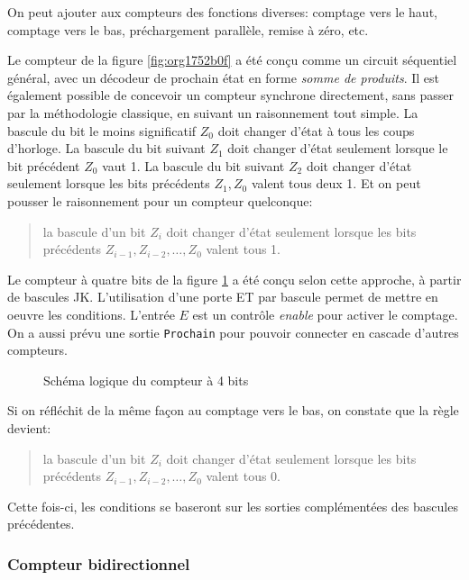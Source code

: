 \documentclass[11pt]{article}
\begin{document}
On peut ajouter aux compteurs des fonctions diverses: comptage vers le
haut, comptage vers le bas, préchargement parallèle, remise à zéro,
etc.

Le compteur de la figure \ref{fig:org1752b0f} a été conçu comme un circuit
séquentiel général, avec un décodeur de prochain état en forme \emph{somme
de produits}. Il est également possible de concevoir un compteur
synchrone directement, sans passer par la méthodologie classique, en
suivant un raisonnement tout simple. La bascule du bit le moins
significatif \(Z_0\) doit changer d'état à tous les coups
d'horloge. La bascule du bit suivant \(Z_1\) doit changer d'état
seulement lorsque le bit précédent \(Z_0\) vaut 1. La bascule du bit
suivant \(Z_2\) doit changer d'état seulement lorsque les bits
précédents \(Z_1, Z_0\) valent tous deux 1. Et on peut pousser le
raisonnement pour un compteur quelconque: 
\begin{quote}
la bascule d'un bit \(Z_i\)
doit changer d'état seulement lorsque les bits précédents
\(Z_{i-1},Z_{i-2},\ldots, Z_0\) valent tous 1.
\end{quote}


Le compteur à quatre bits de la figure \ref{fig:orgbd4f29e} a été conçu
selon cette approche, à partir de bascules JK.  L'utilisation d'une
porte ET par bascule permet de mettre en oeuvre les
conditions. L'entrée \(E\) est un contrôle \emph{enable} pour activer le
comptage. On a aussi prévu une sortie \texttt{Prochain} pour pouvoir
connecter en cascade d'autres compteurs.

\begin{figure}[htbp]
\centering

\caption{\label{fig:orgbd4f29e}Schéma logique du compteur à 4 bits}
\end{figure}

Si on réfléchit de la même façon au comptage vers le bas, on constate
que la règle devient:

\begin{quote}
la bascule d'un bit \(Z_i\) doit changer d'état
seulement lorsque les bits précédents \(Z_{i-1},Z_{i-2},\ldots, Z_0\)
valent tous 0.
\end{quote}
Cette fois-ci, les conditions se baseront sur les sorties
complémentées des bascules précédentes.

\subsubsection{Compteur bidirectionnel}
\label{sec:orgd16da9f}
\end{document}
